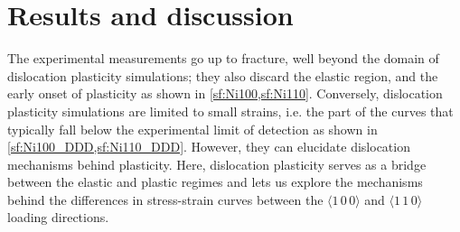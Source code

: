 \section{Results and discussion}
\label{s:NiResults}

The experimental measurements go up to fracture, well beyond the domain of dislocation plasticity simulations; they also discard the elastic region, and the early onset of plasticity as shown in \cref{sf:Ni100,sf:Ni110}. Conversely, dislocation plasticity simulations are limited to small strains, i.e. the part of the curves that typically fall below the experimental limit of detection as shown in \cref{sf:Ni100_DDD,sf:Ni110_DDD}. However, they can elucidate dislocation mechanisms behind plasticity. Here, dislocation plasticity serves as a bridge between the elastic and plastic regimes and lets us explore the mechanisms behind the differences in stress-strain curves between the $\langle 1\,0\,0 \rangle$ and $\langle 1\,1\,0 \rangle$ loading directions.
